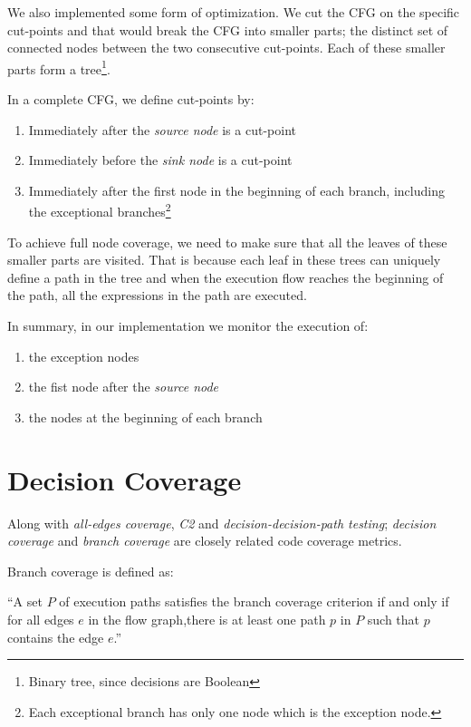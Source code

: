 \documentclass[12pt,a4paper]{report}
\begin{document}
We also implemented some form of optimization. We cut the CFG on the specific cut-points and that would break the CFG into smaller parts; the distinct set of connected nodes between the two consecutive cut-points. Each of these smaller parts form a tree\footnote{Binary tree, since decisions are Boolean}.

In a complete CFG, we define cut-points by:  

\begin{enumerate}
 \item Immediately after the \emph{source node} is a cut-point
 \item Immediately before the \emph{sink node} is a cut-point
 \item Immediately after the first node in the beginning of each branch, including the exceptional branches\footnote{Each exceptional branch has only one node which is the exception node.} 
\end{enumerate}

To achieve full node coverage, we need to make sure that all the leaves of these smaller parts are visited. That is because each leaf in these trees can uniquely define a path in the tree and when the execution flow reaches the beginning of the path, all the expressions in the path are executed.

In summary, in our implementation we monitor the execution of:

\begin{enumerate}
 \item the exception nodes
 \item the fist node after the \emph{source node}
 \item the nodes at the beginning of each branch
\end{enumerate}

\section{Decision Coverage}
Along with \emph{all-edges coverage}, \emph{C2} and \emph{decision-decision-path testing}; \emph{decision coverage} and \emph{branch coverage} are closely related code coverage metrics.

Branch coverage is defined as:

``A set $P$ of execution paths satisfies the branch coverage criterion if and only if for all edges $e$ in the flow graph,there is at least one path $p$ in $P$ such that $p$ contains the edge $e$.''\cite{Zhu:1997:SUT:267580.267590}
\end{document}

